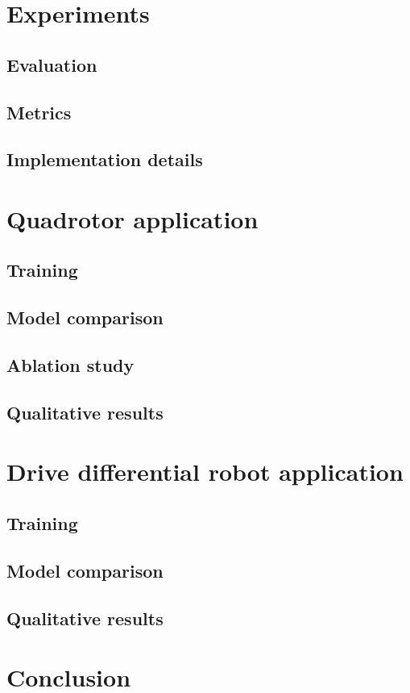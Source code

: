 \section{Experiments}
\subsection{Evaluation}
\subsection{Metrics}
\subsection{Implementation details}

\section{Quadrotor application}
\subsection{Training}
\subsection{Model comparison}
\subsection{Ablation study}
\subsection{Qualitative results}

\section{Drive differential robot application}
\subsection{Training}
\subsection{Model comparison}
\subsection{Qualitative results}

\section{Conclusion} \label{sec:concl}

\todomarker{}